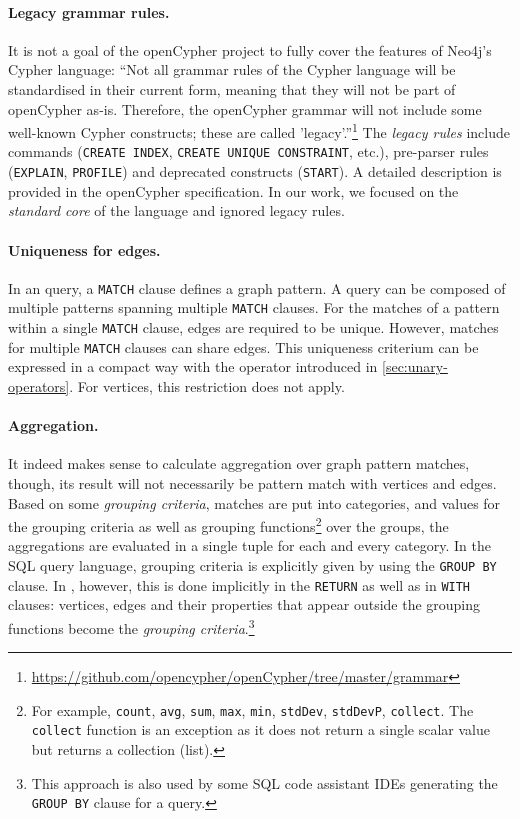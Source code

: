 \paragraph{Legacy grammar rules.} It is not a goal of the openCypher project to fully cover the features of Neo4j's Cypher language: ``Not all grammar rules of the Cypher language will be standardised in their current form, meaning that they will not be part of openCypher as-is. Therefore, the openCypher grammar will not include some well-known Cypher constructs; these are called 'legacy'.''\footnote{\url{https://github.com/opencypher/openCypher/tree/master/grammar}} The \emph{legacy rules} include commands (\lstinline+CREATE INDEX+, \lstinline+CREATE UNIQUE CONSTRAINT+, etc.), pre-parser rules (\lstinline+EXPLAIN+, \lstinline+PROFILE+) and deprecated constructs (\lstinline+START+). A detailed description is provided in the openCypher specification. In our work, we focused on the \emph{standard core} of the language and ignored legacy rules.

\paragraph{Uniqueness for edges.} In an \opencypher query, a \lstinline+MATCH+ clause defines a graph pattern. A query can be composed of multiple patterns spanning multiple \lstinline+MATCH+ clauses. For the matches of a pattern within a single \lstinline+MATCH+ clause, edges are required to be unique. %
However, matches for multiple \lstinline+MATCH+ clauses can share edges. This uniqueness criterium can be expressed in a compact way with the \alldifferenttext operator introduced in \autoref{sec:unary-operators}. For vertices, this restriction does not apply.

\paragraph{Aggregation.} It indeed makes sense to calculate aggregation over graph pattern matches, though, its result will not necessarily be pattern match with vertices and edges. Based on some \emph{grouping criteria}, matches are put into categories, and values for the grouping criteria as well as grouping functions\footnote{For example, \lstinline+count+, \lstinline+avg+, \lstinline+sum+, \lstinline+max+, \lstinline+min+, \lstinline+stdDev+, \lstinline+stdDevP+, \lstinline+collect+. The \lstinline+collect+ function is an exception as it does not return a single scalar value but returns a collection (list).} over the groups, the aggregations are evaluated in a single tuple for each and every category. In the SQL query language, grouping criteria is explicitly given by using the \lstinline+GROUP BY+ clause. In \opencypher, however, this is done implicitly in the \lstinline+RETURN+ as well as in \lstinline+WITH+ clauses: vertices, edges and their properties that appear outside the grouping functions become the \emph{grouping criteria}.\footnote{This approach is also used by some SQL code assistant IDEs generating the \lstinline+GROUP BY+ clause for a query.}

